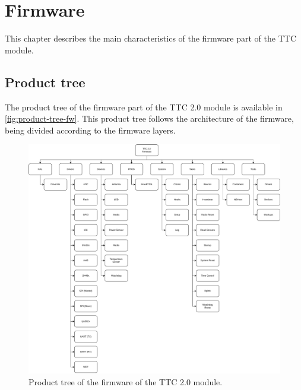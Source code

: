 %
%
%
%
%

%
%
%
%
%


\chapter{Firmware} \label{ch:firmware}

This chapter describes the main characteristics of the firmware part of the TTC module.

\section{Product tree}

The product tree of the firmware part of the TTC 2.0 module is available in \autoref{fig:product-tree-fw}. This product tree follows the architecture of the firmware, being divided according to the firmware layers.

\begin{figure}[!ht]
    \begin{center}
        \includegraphics[width=\textwidth]{figures/product-tree-fw.pdf}
        \caption{Product tree of the firmware of the TTC 2.0 module.}
        \label{fig:product-tree-fw}
    \end{center}
\end{figure}

